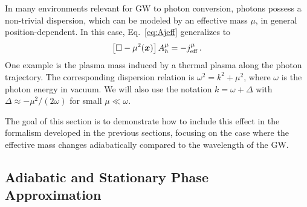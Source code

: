 \documentclass[a4paper,11pt]{article}
\begin{document}
In many environments relevant for GW to photon conversion, photons possess a non-trivial dispersion, which can be modeled by  an effective mass $\mu$, in general position-dependent. In this case, Eq.~\eqref{eq:Ajeff} generalizes to
\begin{align}
    \left[ \Box - \mu^{2}(\bm{x}) \right] A_{h}^{\mu} = - j_{\rm eff}^{\mu}\,.
    \label{eq:eom_mass}
\end{align}
%
One example is the plasma mass induced by a thermal plasma along the photon trajectory.
%
The corresponding dispersion relation is $ \omega^{2} = k^{2} + \mu^{2} $, where $ \omega$ is the photon energy in vacuum.  We will also use the notation $ k = \omega + \Delta $ with $ \Delta \approx - \mu^{2} / (2\omega) $ for small $ \mu \ll \omega $.  



The goal of this section is to demonstrate how to include this effect in the formalism developed in the previous sections, focusing on the case where the effective mass changes adiabatically compared to the wavelength of the GW.




\subsection{Adiabatic and Stationary Phase Approximation}

\label{sec:Adiabatic Case_WKB}
\end{document}
